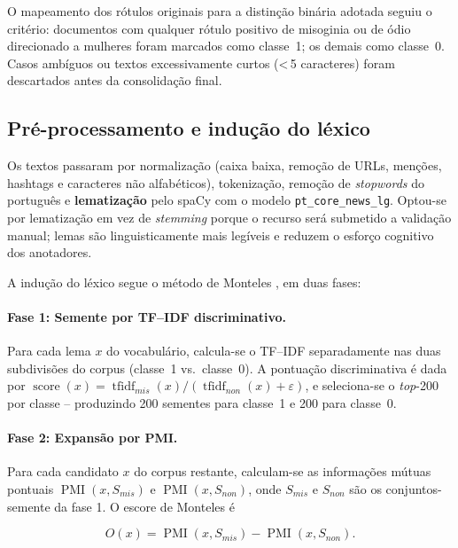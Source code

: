 \documentclass[12pt]{article}
\begin{document}
O mapeamento dos r\'otulos originais para a distin\c{c}\~ao bin\'aria
adotada seguiu o crit\'erio: documentos com qualquer r\'otulo positivo de
misoginia ou de \'odio direcionado a mulheres foram marcados como
classe~1; os demais como classe~0. Casos amb\'iguos ou textos
excessivamente curtos (\textless\,5 caracteres) foram descartados antes
da consolida\c{c}\~ao final.

\subsection{Pr\'e-processamento e indu\c{c}\~ao do l\'exico}

Os textos passaram por normaliza\c{c}\~ao (caixa baixa, remo\c{c}\~ao de
URLs, men\c{c}\~oes, hashtags e caracteres n\~ao alfab\'eticos),
tokeniza\c{c}\~ao, remo\c{c}\~ao de \emph{stopwords} do portugu\^es e
\textbf{lematiza\c{c}\~ao} pelo spaCy \cite{honnibal2017spacy} com o
modelo \texttt{pt\_core\_news\_lg}. Optou-se por lematiza\c{c}\~ao em vez
de \emph{stemming} porque o recurso ser\'a submetido a valida\c{c}\~ao
manual; lemas s\~ao linguisticamente mais leg\'iveis e reduzem o esfor\c{c}o
cognitivo dos anotadores.

A indu\c{c}\~ao do l\'exico segue o m\'etodo de Monteles
\cite{monteles2023}, em duas fases:

\paragraph{Fase 1: Semente por TF--IDF discriminativo.}
Para cada lema $x$ do vocabul\'ario, calcula-se o TF--IDF separadamente
nas duas subdivis\~oes do corpus (classe~1 vs.\ classe~0). A pontua\c{c}\~ao
discriminativa \'e dada por
$\operatorname{score}(x) = \operatorname{tfidf}_{mis}(x) /
(\operatorname{tfidf}_{non}(x) + \varepsilon)$, e seleciona-se o
\emph{top}-200 por classe -- produzindo 200 sementes para classe~1 e 200
para classe~0.

\paragraph{Fase 2: Expans\~ao por PMI.}
Para cada candidato $x$ do corpus restante, calculam-se as
informa\c{c}\~oes m\'utuas pontuais $\operatorname{PMI}(x, S_{mis})$ e
$\operatorname{PMI}(x, S_{non})$, onde $S_{mis}$ e $S_{non}$ s\~ao os
conjuntos-semente da fase 1. O escore de Monteles \'e

\begin{equation}
O(x) = \operatorname{PMI}(x, S_{mis}) - \operatorname{PMI}(x, S_{non}).
\label{eq:o}
\end{equation}
\end{document}
